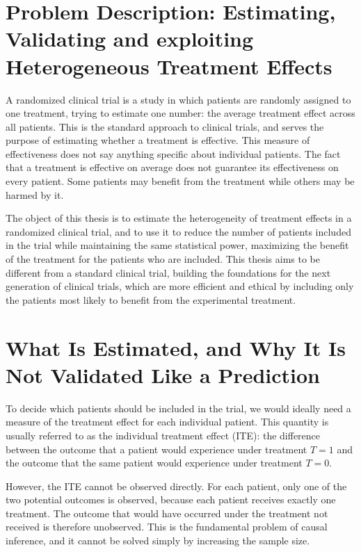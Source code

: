 \section{Problem Description: Estimating, Validating and exploiting Heterogeneous Treatment Effects}

A randomized clinical trial is a study in which patients are randomly assigned to one treatment, trying to estimate one number:
the average treatment effect across all patients. This is the standard approach to clinical trials, and serves the
purpose of estimating whether a treatment is effective. This measure of effectiveness does not say anything specific
about individual patients. The fact that a treatment is effective on average does not guarantee its effectiveness
on every patient. Some patients may benefit from the treatment while others may be harmed by it.

The object of this thesis is to estimate the heterogeneity of treatment effects in a randomized clinical trial,
and to use it to reduce the number of patients included in the trial while maintaining the same statistical power,
maximizing the benefit of the treatment for the patients who are included.
This thesis aims to be different from a standard clinical trial, building the foundations for the next generation
of clinical trials, which are more efficient and ethical by including only the patients most likely to benefit
from the experimental treatment.

\section{What Is Estimated, and Why It Is Not Validated Like a Prediction}


To decide which patients should be included in the trial, we would ideally need a measure 
of the treatment effect for each individual patient. This quantity is usually referred to
as the individual treatment effect (ITE): the difference between the outcome that a patient 
would experience under treatment $T=1$ and the outcome that the same 
patient would experience under treatment $T=0$.

However, the ITE cannot be observed directly. For each patient, only one of the two 
potential outcomes is observed, because each patient receives exactly one treatment. 
The outcome that would have occurred under the treatment not received is therefore unobserved. 
This is the fundamental problem of causal inference, and it cannot be solved simply by increasing the sample size.

